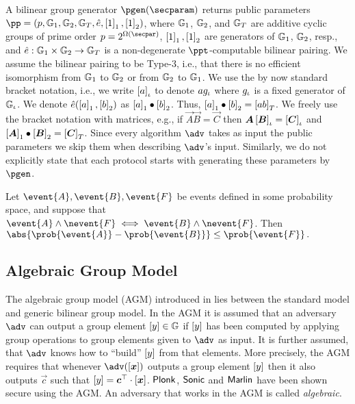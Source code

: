 A bilinear group generator $\pgen (\secparam)$ returns public parameters $ \pp =
(p, \GRP_1, \GRP_2, \GRP_T, \pair, \gone{1}, \gtwo{1})$, where $\mathbb{G}_1$,
$\mathbb{G}_2$, and $\mathbb{G}_T$ are additive cyclic groups of prime order $p = 2^{\Omega
  (\secpar)}$, $\left[1\right]_{1}, \left[1\right]_{2}$ are generators of $\mathbb{G}_1$, $\mathbb{G}_2$, resp.,
and $\hat{e}: \mathbb{G}_1 \times \mathbb{G}_2 \to \mathbb{G}_T$ is a non-degenerate
$\ppt$-computable bilinear pairing. We assume the bilinear pairing to be Type-3,
i.e., that there is no efficient isomorphism from $\mathbb{G}_1$ to $\mathbb{G}_2$ or from
$\mathbb{G}_2$ to $\mathbb{G}_1$. We use the by now standard bracket notation, i.e., we
write $\left[a\right]_{\iota}$ to denote $a g_{\iota}$ where $g_{\iota}$ is a fixed generator
of $\mathbb{G}_{\iota}$. We denote $\hat{e} (\left[a\right]_{1}, \left[b\right]_{2})$ as $\left[a\right]_{1} \bullet
\left[b\right]_{2}$. Thus, $\left[a\right]_{1} \bullet \left[b\right]_{2} = \left[a b\right]_{T}$. We freely use the
bracket notation with matrices, e.g., if $\vec{A} \vec{B} = \vec{C}$ then
$\vec{A} \grpgi{\vec{B}} = \grpgi{\vec{C}}$ and $\gone{\vec{A}}\bullet
\gtwo{\vec{B}} = \gtar{\vec{C}}$. Since every algorithm $\adv$ takes as input
the public parameters we skip them when describing $\adv$'s input. Similarly, we
do not explicitly state that each protocol starts with generating these
parameters by $\pgen$.

\begin{lemma}
	\label{lem:difference_lemma}
	Let $\event{A}, \event{B}, \event{F}$ be events defined in some probability
	space, and suppose that $\event{A} \land \nevent{F} \iff \event{B}
		\land \nevent{F}$.  Then 
	$
		\abs{\prob{\event{A}} - \prob{\event{B}}} \leq \prob{\event{F}}\,.
	$
\end{lemma}
\subsection{Algebraic Group Model}
The algebraic group model (AGM) introduced in \cite{C:FucKilLos18} lies between the
standard model and generic bilinear group model. In the AGM it is assumed that an
adversary $\adv$ can output a group element $\left[y\right] \in \mathbb{G}$ if $\left[y\right]$ has
been computed by applying group operations to group elements given to $\adv$ as
input. It is further assumed, that $\adv$ knows how to ``build'' $\left[y\right]$ from
that elements. More precisely, the AGM requires that whenever $\adv(\gnone{\vec{x}})$
outputs a group element $\left[y\right]$ then it also outputs $\vec{c}$ such that
$\gnone{y} = \vec{c}^\top \cdot \gnone{\vec{x}}$. $\textnormal{\textsf{Plonk}}$, ${\textnormal{\textsf{Sonic}}}$ and ${\textnormal{\textsf{Marlin}}}$
have been shown secure using the AGM. An adversary that works in the AGM is called
\emph{algebraic}.

